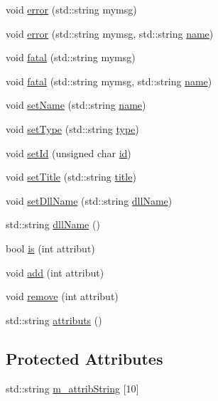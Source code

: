 \begin{DoxyCompactItemize}
\item 
void \hyperlink{classObject_a204a95f57818c0f811933917a30eff45}{error} (std\+::string mymsg)
\item 
void \hyperlink{classObject_ad7f6c457733082efa2f9ff5f5c8e119a}{error} (std\+::string mymsg, std\+::string \hyperlink{classObject_a300f4c05dd468c7bb8b3c968868443c1}{name})
\item 
void \hyperlink{classObject_aad5a16aac7516ce65bd5ec02ab07fc80}{fatal} (std\+::string mymsg)
\item 
void \hyperlink{classObject_ae62acd3d09f716220f75f252dc38bc9a}{fatal} (std\+::string mymsg, std\+::string \hyperlink{classObject_a300f4c05dd468c7bb8b3c968868443c1}{name})
\item 
void \hyperlink{classObject_ae30fea75683c2d149b6b6d17c09ecd0c}{set\+Name} (std\+::string \hyperlink{classObject_a300f4c05dd468c7bb8b3c968868443c1}{name})
\item 
void \hyperlink{classObject_aae534cc9d982bcb9b99fd505f2e103a5}{set\+Type} (std\+::string \hyperlink{classObject_a84f99f70f144a83e1582d1d0f84e4e62}{type})
\item 
void \hyperlink{classObject_a398fe08cba594a0ce6891d59fe4f159f}{set\+Id} (unsigned char \hyperlink{classObject_af99145335cc61ff6e2798ea17db009d2}{id})
\item 
void \hyperlink{classObject_a89557dbbad5bcaa02652f5d7fa35d20f}{set\+Title} (std\+::string \hyperlink{classObject_a73a0f1a41828fdd8303dd662446fb6c3}{title})
\item 
void \hyperlink{classObject_a870c5af919958c2136623b2d7816d123}{set\+Dll\+Name} (std\+::string \hyperlink{classObject_a2e3947f2870094c332d7454117f3ec63}{dll\+Name})
\item 
std\+::string \hyperlink{classObject_a2e3947f2870094c332d7454117f3ec63}{dll\+Name} ()
\item 
bool \hyperlink{classAttrib_a704f26af560909ad22065083bb7d4c34}{is} (int attribut)
\item 
void \hyperlink{classAttrib_a235f773af19c900264a190b00a3b4ad7}{add} (int attribut)
\item 
void \hyperlink{classAttrib_a7d4ef7e32d93cb287792b87b857e79f3}{remove} (int attribut)
\item 
std\+::string \hyperlink{classAttrib_aee7bbf16b144887f196e1341b24f8a26}{attributs} ()
\end{DoxyCompactItemize}
\subsection*{Protected Attributes}
\begin{DoxyCompactItemize}
\item 
std\+::string \hyperlink{classAttrib_a3414521d7a82476e874b25a5407b5e63}{m\+\_\+attrib\+String} \mbox{[}10\mbox{]}
\end{DoxyCompactItemize}
